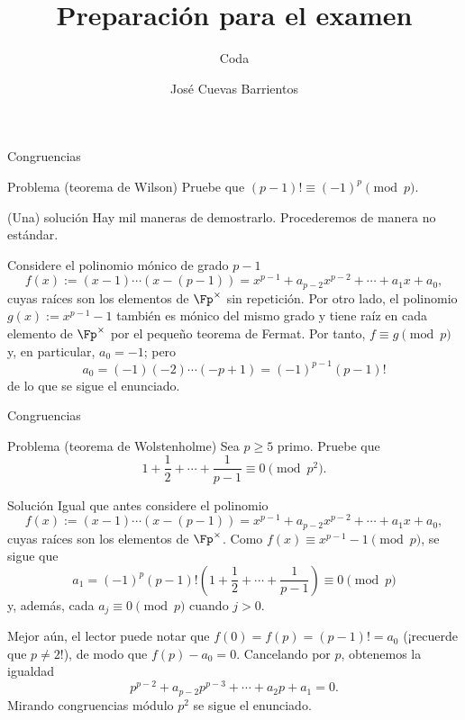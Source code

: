 \documentclass[handout, 10pt]{beamer}
\title{Preparación para el examen}
\subtitle{Coda}
\date{\DTMdate{2025-11-28}}
\author{José Cuevas Barrientos}
\begin{document}
\maketitle

\begin{frame}{Congruencias}
	\begin{block}{Problema (teorema de Wilson)}
		Pruebe que $(p - 1)! \equiv (-1)^p \pmod{p}$.
	\end{block}
\end{frame}
\begin{frame}{(Una) solución}
	Hay mil maneras de demostrarlo. Procederemos de manera no estándar.

	\pause
	Considere el polinomio mónico de grado $p-1$
	\[
		f(x) := (x - 1) \cdots (x - (p-1)) = x^{p-1} + a_{p-2}x^{p-2} + \cdots + a_1x + a_0,
	\]
	cuyas raíces son los elementos de $\Fp^\times$ sin repetición.
	\pause
	Por otro lado, el polinomio $g(x) := x^{p-1} - 1$ también es mónico del mismo grado y tiene raíz en cada elemento de $\Fp^\times$
	por el pequeño teorema de Fermat.
	\pause
	Por tanto, $f \equiv g \pmod p$ y, en particular, $a_0 = -1$; pero
	\[
		a_0 = (-1)(-2)\cdots (-p+1) = (-1)^{p-1} (p - 1)!
	\]
	de lo que se sigue el enunciado.
\end{frame}

\begin{frame}{Congruencias}
	\begin{block}{Problema (teorema de Wolstenholme)}
		Sea $p \ge 5$ primo.
		Pruebe que
		\[
			1 + \frac{1}{2} + \cdots + \frac{1}{p-1} \equiv 0 \pmod{p^2}.
		\]
	\end{block}
\end{frame}
\begin{frame}{Solución}
	Igual que antes considere el polinomio
	\[
		f(x) := (x - 1) \cdots (x - (p-1)) = x^{p-1} + a_{p-2}x^{p-2} + \cdots + a_1x + a_0,
	\]
	cuyas raíces son los elementos de $\Fp^\times$.
	\pause
	Como $f(x) \equiv x^{p-1} - 1 \pmod p$, se sigue que
	\[
		a_1 = (-1)^p(p-1)!\left( 1 + \frac{1}{2} + \cdots + \frac{1}{p - 1} \right) \equiv 0 \pmod p
	\]
	y, además, cada $a_j \equiv 0 \pmod p$ cuando $j > 0$.

	\pause
	Mejor aún, el lector puede notar que $f(0) = f(p) = (p-1)! = a_0$ (¡recuerde que $p \ne 2$!),
	de modo que $f(p) - a_0 = 0$.
	\pause
	Cancelando por $p$, obtenemos la igualdad
	\[
		p^{p-2} + a_{p-2}p^{p-3} + \cdots + a_2p + a_1 = 0.
	\]
	Mirando congruencias módulo $p^2$ se sigue el enunciado.
\end{frame}
\end{document}
